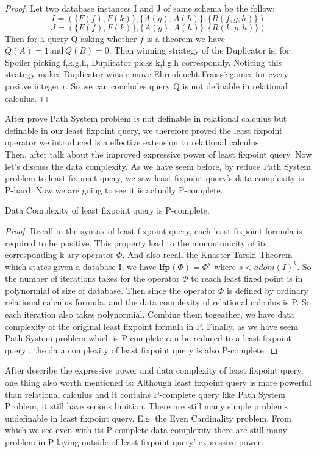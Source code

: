 \begin{proof}
Let two database instances I and J of same schema be the follow:
$$I=(\{F(f), F(k)\}, \{A(g),A(h)\},\{R(f,g,h)\})$$
$$J=(\{F(f), F(k)\}, \{A(g),A(h)\}, \{R(k,g,h)\})$$
Then for a query Q asking whether $f$ is a theorem we have $Q(A)=1 \, \text{and} \, Q(B)=0$. Then winning strategy of the Duplicator is: for Spoiler picking f,k,g,h, Duplicator picks k,f,g,h correspondly. Noticing this strategy makes Duplicator wins r-move Ehrenfeucht-Fra\"iss\'e games for every positve integer r. So we can concludes query Q is not definable in relational calculus.
\end{proof}

After prove Path System problem is not definable in relational calculus but definable in our least fixpoint query, we therefore proved the least fixpoint operator we introduced is a effective extension to relational calculus.\\

Then, after talk about the improved expressive power of least fixpoint query. Now let's discuss the data complexity. As we have seem before, by reduce Path System problem to least fixpoint query, we saw least fixpoint query's data complexity is P-hard. Now we are going to see it is actually P-complete.\\

\begin{claim}
Data Complexity of least fixpoint query is P-complete.
\end{claim}
\begin{proof}
Recall in the syntax of least fixpoint query, each least fixpoint formula is required to be positive. This property lead to the monontonicity of its corresponding k-ary operator $\Phi$. And also recall the Knaster-Tarski Theorem which states given a database I, we have $\textbf{lfp}(\Phi)=\Phi^s$ where $s<adom(I)^k$. So the number of iterations takes for the operator $\Phi$ to reach least fixed point is in polynormial of size of database. Then since the operator $\Phi$ is defined by ordinary relational calculus formula, and the data complexity of relational calculus is P. So each iteration also takes polynormial. Combine them togeather, we have data complexity of the original least fixpoint formula in P. Finally, as we have seem Path System problem which is P-complete can be reduced to a least fixpoint query , the data complexity of least fixpoint query is also P-complete. 
\end{proof}

After describe the expressive power and data complexity of least fixpoint query, one thing also worth mentioned is: Although least fixpoint query is more powerful than relational calculus and it contains P-complete query like Path System Problem, it still have serious limition. There are still many simple problems undefinable in least fixpoint query. E.g. the Even Cardinality problem\cite{kolaitis1}. From which we see even with its P-complete data complexity there are still many problem in P laying outside of least fixpoint query' expressive power.



